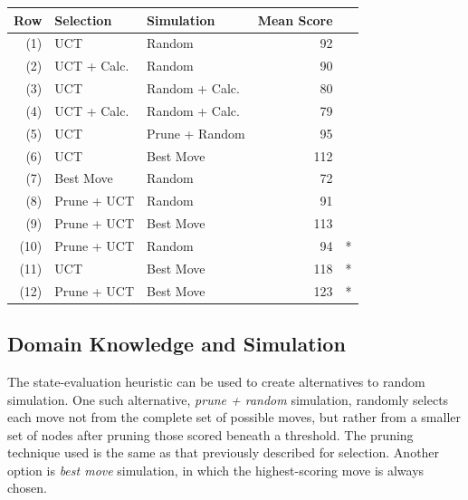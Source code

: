 \documentclass[letterpaper]{article}
\begin{document}
\begin{table}
\label{tbl:SelSim}
\centering
\begin{tabular}{rllr@{}l}
\hline
{\centering\bf Row} & {\centering\bf Selection} & {\centering\bf Simulation} & {\centering\bf Mean Score} & \\
\hline
\hline
(1) & UCT & Random & 92 \\
(2) & UCT + Calc. & Random & 90 \\
(3) & UCT & Random + Calc. & 80 \\
(4) & UCT + Calc. & Random + Calc. & 79 \\
\hline
(5) & UCT & Prune + Random & 95 \\
(6) & UCT & Best Move & 112 \\
\hline
(7) & Best Move & Random & 72 \\
(8) & Prune + UCT & Random & 91 \\
\hline
(9) & Prune + UCT & Best Move & 113 \\
\hline
(10) & Prune + UCT & Random & 94&\mbox{*}  \\
(11) & UCT & Best Move & 118&\mbox{*} \\
(12) & Prune + UCT & Best Move & 123&\mbox{*}  \\
\end{tabular}
\end{table}

\subsection{Domain Knowledge and Simulation}


The state-evaluation heuristic can be used to create alternatives to random simulation. One such alternative, {\it prune + random} simulation, randomly selects each move not from the complete set of possible moves, but rather from a smaller set of nodes after pruning those scored beneath a threshold. The pruning technique used is the same as that previously described for selection. Another option is {\it best move} simulation, in which the highest-scoring move is always chosen.
\end{document}
